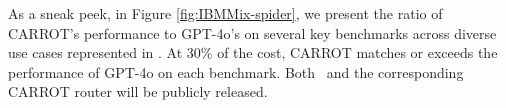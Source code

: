 
As a sneak peek, in Figure \ref{fig:IBMMix-spider}, we present the ratio of CARROT's performance to GPT-4o's \citep{openai2024gpt4} on several key benchmarks across diverse use cases represented in \newdata. At $30 \%$ of the cost, CARROT matches or exceeds the performance of GPT-4o on each benchmark. Both \newdata\ and the corresponding CARROT router will be publicly released.

 



